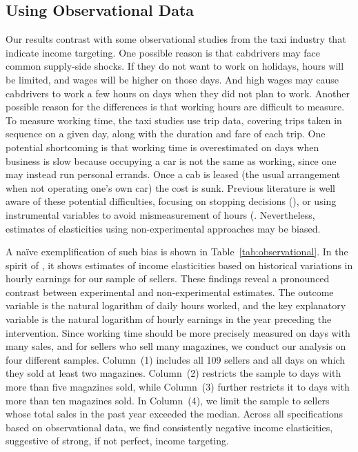 \documentclass[12pt]{article}
\begin{document}
\subsection{Using Observational Data}
Our results contrast with some observational studies from the taxi industry that indicate income targeting. One possible reason is that cabdrivers may face common supply-side shocks. If they do not want to work on holidays, hours will be limited, and wages will be higher on those days. And high wages may cause cabdrivers to work a few hours on days when they did not plan to work. Another possible reason for the differences is that working hours are difficult to measure. To measure working time, the taxi studies use trip data, covering trips taken in sequence on a given day, along with the duration and fare of each trip. One potential shortcoming is that working time is overestimated on days when business is slow because occupying a car is not the same as working, since one may instead run personal errands. Once a cab is leased (the usual arrangement when not operating one’s own car) the cost is sunk. Previous literature is well aware of these potential difficulties, focusing on stopping decisions (\citet{agarwal2015singaporean}), or using instrumental variables to avoid mismeasurement of hours (\citet{camerer1997labor}. Nevertheless, estimates of elasticities using non-experimental approaches may be biased.

A naïve exemplification of such bias is shown in Table~\ref{tab:observational}. In the spirit of \citet{lalonde1986evaluating}, it shows estimates of income elasticities based on historical variations in hourly earnings for our sample of sellers. These findings reveal a pronounced contrast between experimental and non-experimental estimates. The outcome variable is the natural logarithm of daily hours worked, and the key explanatory variable is the natural logarithm of hourly earnings in the year preceding the intervention. Since working time should be more precisely measured on days with many sales, and for sellers who sell many magazines, we conduct our analysis on four different samples. Column~(1) includes all 109 sellers and all days on which they sold at least two magazines. Column~(2) restricts the sample to days with more than five magazines sold, while Column~(3) further restricts it to days with more than ten magazines sold. In Column~(4), we limit the sample to sellers whose total sales in the past year exceeded the median. Across all specifications based on observational data, we find consistently negative income elasticities, suggestive of strong, if not perfect, income targeting.
\end{document}
